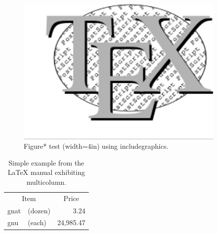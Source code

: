 \documentclass{article}
\begin{document}
\begin{figure}
\includegraphics[width=4in]{fig_testa}
\caption{Figure* test (width=4in) using includegraphics.} 
\label{figure1a}
\end{figure}

\begin{table}
\begin{center}
\begin{tabular}{llr}
\multicolumn{2}{c}{Item} & \multicolumn{1}{c}{Price} \\
gnat      & (dozen)  & 3.24\\
gnu       & (each)   & 24,985.47 
\end{tabular}
\caption{Simple example from the \LaTeX{} manual exhibiting multicolumn.}
\end{center}
\end{table}
\end{document}

